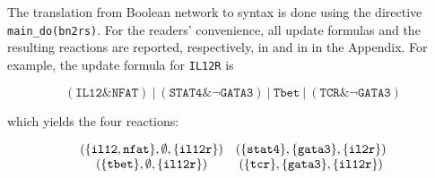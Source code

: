 %
The translation from Boolean network to \BioResolve syntax is done using the directive \verb=main_do(bn2rs)=.
For the readers' convenience, all update formulas and the resulting reactions are reported, respectively, in  and in  in the Appendix. 
For example, the update formula for \texttt{IL12R} is
%
\begin{small}
\[
 (\mathtt{IL12} \& \mathtt{NFAT})~|~(\mathtt{STAT4} \& \neg \mathtt{GATA3})~|~ \mathtt{Tbet}~|~(\mathtt{TCR} \& \neg \mathtt{GATA3})
\]
\end{small}
%
which yields the four reactions:
%
\begin{small}
\[
\begin{array}{c@{{\quad}}c}
\mathtt{(\{il12,nfat\},\emptyset,\{il12r\})}
 & \mathtt{(\{stat4\},\{gata3\},\{il2r\})} \\
\mathtt{(\{tbet\},\emptyset,\{il12r\})}
 & \mathtt{(\{tcr\},\{gata3\},\{il12r\})} \\ 
\end{array} 
\]
\end{small}

